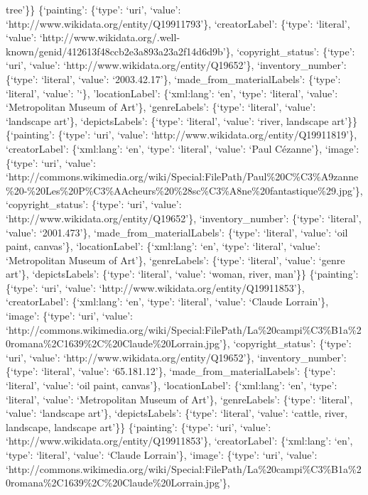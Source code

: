 \documentclass[
  letterpaper,
  DIV=11,
  numbers=noendperiod]{scrreprt}
\begin{document}
tree'\}\} \{`painting': \{`type': `uri', `value':
`http://www.wikidata.org/entity/Q19911793'\}, `creatorLabel': \{`type':
`literal', `value':
`http://www.wikidata.org/.well-known/genid/412613f48ccb2e3a893a23a2f14d6d9b'\},
`copyright\_status': \{`type': `uri', `value':
`http://www.wikidata.org/entity/Q19652'\}, `inventory\_number':
\{`type': `literal', `value': `2003.42.17'\},
`made\_from\_materialLabels': \{`type': `literal', `value': '`\},
'locationLabel': \{`xml:lang': `en', `type': `literal', `value':
`Metropolitan Museum of Art'\}, `genreLabels': \{`type': `literal',
`value': `landscape art'\}, `depictsLabels': \{`type': `literal',
`value': `river, landscape art'\}\} \{`painting': \{`type': `uri',
`value': `http://www.wikidata.org/entity/Q19911819'\}, `creatorLabel':
\{`xml:lang': `en', `type': `literal', `value': `Paul Cézanne'\},
`image': \{`type': `uri', `value':
`http://commons.wikimedia.org/wiki/Special:FilePath/Paul\%20C\%C3\%A9zanne\%20-\%20Les\%20P\%C3\%AAcheurs\%20\%28sc\%C3\%A8ne\%20fantastique\%29.jpg'\},
`copyright\_status': \{`type': `uri', `value':
`http://www.wikidata.org/entity/Q19652'\}, `inventory\_number':
\{`type': `literal', `value': `2001.473'\},
`made\_from\_materialLabels': \{`type': `literal', `value': `oil paint,
canvas'\}, `locationLabel': \{`xml:lang': `en', `type': `literal',
`value': `Metropolitan Museum of Art'\}, `genreLabels': \{`type':
`literal', `value': `genre art'\}, `depictsLabels': \{`type': `literal',
`value': `woman, river, man'\}\} \{`painting': \{`type': `uri', `value':
`http://www.wikidata.org/entity/Q19911853'\}, `creatorLabel':
\{`xml:lang': `en', `type': `literal', `value': `Claude Lorrain'\},
`image': \{`type': `uri', `value':
`http://commons.wikimedia.org/wiki/Special:FilePath/La\%20campi\%C3\%B1a\%20romana\%2C1639\%2C\%20Claude\%20Lorrain.jpg'\},
`copyright\_status': \{`type': `uri', `value':
`http://www.wikidata.org/entity/Q19652'\}, `inventory\_number':
\{`type': `literal', `value': `65.181.12'\},
`made\_from\_materialLabels': \{`type': `literal', `value': `oil paint,
canvas'\}, `locationLabel': \{`xml:lang': `en', `type': `literal',
`value': `Metropolitan Museum of Art'\}, `genreLabels': \{`type':
`literal', `value': `landscape art'\}, `depictsLabels': \{`type':
`literal', `value': `cattle, river, landscape, landscape art'\}\}
\{`painting': \{`type': `uri', `value':
`http://www.wikidata.org/entity/Q19911853'\}, `creatorLabel':
\{`xml:lang': `en', `type': `literal', `value': `Claude Lorrain'\},
`image': \{`type': `uri', `value':
`http://commons.wikimedia.org/wiki/Special:FilePath/La\%20campi\%C3\%B1a\%20romana\%2C1639\%2C\%20Claude\%20Lorrain.jpg'\},
\end{document}
